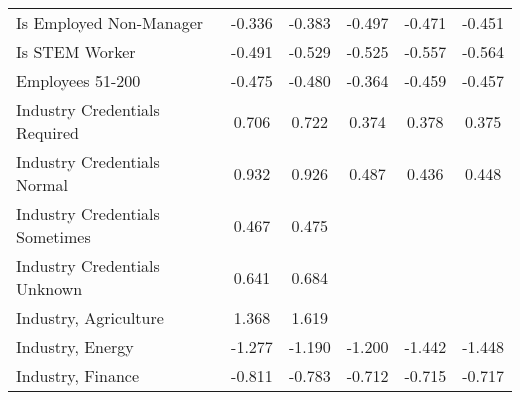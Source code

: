 {\begin{center}
{\begin{longtable}{l*{5}{c}}
Is Employed Non-Manager  &      -0.336         &      -0.383\sym{*}  &      -0.497\sym{**} &      -0.471\sym{**} &      -0.451\sym{**} \\
\addlinespace
Is STEM Worker           &      -0.491\sym{**} &      -0.529\sym{**} &      -0.525\sym{**} &      -0.557\sym{**} &      -0.564\sym{**} \\
\addlinespace
Employees 51-200         &      -0.475\sym{*}  &      -0.480\sym{**} &      -0.364         &      -0.459\sym{*}  &      -0.457\sym{*}  \\
\addlinespace
Industry Credentials Required&       0.706\sym{*}  &       0.722\sym{**} &       0.374         &       0.378         &       0.375         \\
\addlinespace
Industry Credentials Normal&       0.932\sym{**} &       0.926\sym{**} &       0.487\sym{*}  &       0.436\sym{*}  &       0.448\sym{*}  \\
\addlinespace
Industry Credentials Sometimes&       0.467         &       0.475         &                     &                     &                     \\
\addlinespace
Industry Credentials Unknown&       0.641\sym{*}  &       0.684\sym{**} &                     &                     &                     \\
\addlinespace
Industry, Agriculture    &       1.368         &       1.619\sym{*}  &                     &                     &                     \\
\addlinespace
Industry, Energy         &      -1.277\sym{*}  &      -1.190\sym{*}  &      -1.200\sym{*}  &      -1.442\sym{**} &      -1.448\sym{**} \\
\addlinespace
Industry, Finance &      -0.811\sym{***}&      -0.783\sym{***}&      -0.712\sym{***}&      -0.715\sym{***}&      -0.717\sym{***}\\

\end{longtable}}
\end{center}}

